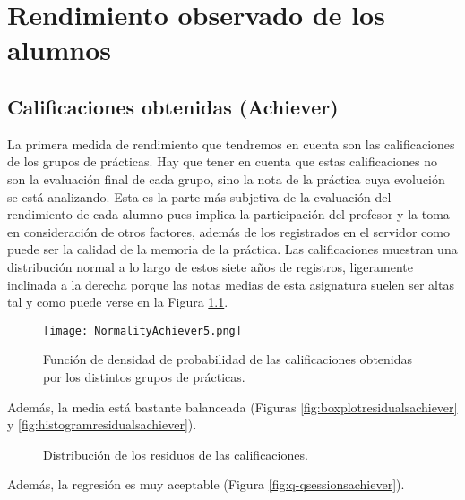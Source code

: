 \chapter{Rendimiento observado de los alumnos}

\section{Calificaciones obtenidas (Achiever)}

La primera medida de rendimiento que tendremos en cuenta son las calificaciones de los grupos de prácticas. Hay que tener en cuenta que estas calificaciones no son la evaluación final de cada grupo, sino la nota de la práctica cuya evolución se está analizando. Esta es la parte más subjetiva de la evaluación del rendimiento de cada alumno pues implica la participación del profesor y la toma en consideración de otros factores, además de los registrados en el servidor como puede ser la calidad de la memoria de la práctica. Las calificaciones muestran una distribución normal a lo largo de estos siete años de registros, ligeramente inclinada a la derecha porque las notas medias de esta asignatura suelen ser altas tal y como puede verse en la Figura \ref{fig:densityplotachiever}.

\begin{figure}[H]
    \centering
    \texttt{[image: NormalityAchiever5.png]}
    \caption{Función de densidad de probabilidad de las calificaciones obtenidas por los distintos grupos de prácticas.}
    \label{fig:densityplotachiever}
\end{figure}

Además, la media está bastante balanceada (Figuras \ref{fig:boxplotresidualsachiever} y \ref{fig:histogramresidualsachiever}).

\begin{figure}[H]
\centering
{}\qquad
{}
\caption{Distribución de los residuos de las calificaciones.}
\label{fig:achiever}
\end{figure}

Además, la regresión es muy aceptable (Figura \ref{fig:q-qsessionsachiever}).

